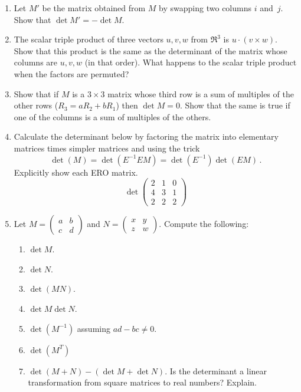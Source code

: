 \begin{enumerate}
\item Let $M'$ be the matrix obtained from $M$ by swapping two columns $i$ and~$j$. Show that $\det M'=-\det M $.

\item The scalar triple product of three vectors $u,v,w$ from $\Re^3$ is $u\cdot(v\times w)$. Show that this product is the same as the determinant of the matrix whose columns are $u,v,w$ (in that order). What happens to the scalar triple product when the factors are permuted? 

\item Show that if $M$ is a $3\times 3$ matrix whose third row is a sum of multiples of the other rows ($R_3=aR_2+bR_1$) then $\det M=0$. Show that the same is true if one of the columns is a sum of multiples of the others. 




\item Calculate the determinant below by factoring the matrix into 
elementary matrices times simpler matrices and using the trick
\[\det (M)= \det ( E^{-1}EM)=
\det (E^{-1})  \det (EM)\, .\] Explicitly show each ERO matrix.
\[
\det
\begin{pmatrix}
2 & 1 &0\\
4 & 3&1\\
2&2&2
\end{pmatrix}
\]


\item Let $M=\begin{pmatrix}
a & b \\
c & d
\end{pmatrix}$ and $N=\begin{pmatrix}
x & y \\
z & w
\end{pmatrix}$.  Compute the following:
\begin{enumerate}
\item $\det M$.
\item $\det N$.
\item $\det (MN)$.
\item $\det M \det N$.
\item $\det (M^{-1})$ assuming $ad-bc\neq 0$.
\item $\det (M^T)$
\item $\det (M+N) - (\det M + \det N)$. Is the determinant a linear transformation from square matrices to real numbers? Explain.
\end{enumerate}


\end{enumerate}
